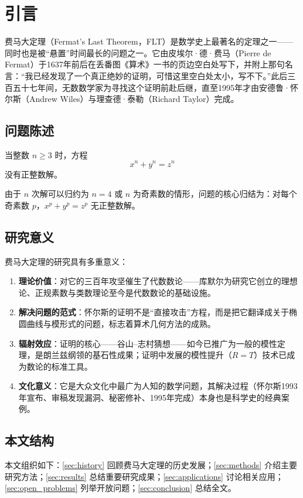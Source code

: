 \section{引言}\label{sec:introduction}

费马大定理（Fermat's Last Theorem，FLT）是数学史上最著名的定理之一——同时也是被“悬置”时间最长的问题之一。它由皮埃尔·德·费马（Pierre de Fermat）于1637年前后在丢番图《算术》一书的页边空白处写下，并附上那句名言：“我已经发现了一个真正绝妙的证明，可惜这里空白处太小，写不下。”此后三百五十七年间，无数数学家为寻找这个证明前赴后继，直至1995年才由安德鲁·怀尔斯（Andrew Wiles）与理查德·泰勒（Richard Taylor）完成\cite{wiles1995modular,taylor1995ring}。

\subsection{问题陈述}

\begin{theorem}[费马大定理]\label{thm:FLT}
    当整数 $n \ge 3$ 时，方程
    \begin{equation}
        x^n + y^n = z^n
    \end{equation}
    没有正整数解。
\end{theorem}

由于 $n$ 次解可以归约为 $n = 4$ 或 $n$ 为奇素数的情形，问题的核心归结为：对每个奇素数 $p$，$x^p + y^p = z^p$ 无正整数解。

\subsection{研究意义}

费马大定理的研究具有多重意义：

\begin{enumerate}[label=(\arabic*)]
    \item \textbf{理论价值}：对它的三百年攻坚催生了代数数论——库默尔为研究它创立的理想论、正规素数与类数理论至今是代数数论的基础设施。
    \item \textbf{解决问题的范式}：怀尔斯的证明不是“直接攻击”方程，而是把它翻译成关于椭圆曲线与模形式的问题，标志着算术几何方法的成熟。
    \item \textbf{辐射效应}：证明的核心——谷山--志村猜想——如今已推广为一般的模性定理，是朗兰兹纲领的基石性成果；证明中发展的模性提升（$R=T$）技术已成为数论的标准工具。
    \item \textbf{文化意义}：它是大众文化中最广为人知的数学问题，其解决过程（怀尔斯1993年宣布、审稿发现漏洞、秘密修补、1995年完成）本身也是科学史的经典案例。
\end{enumerate}

\subsection{本文结构}

本文组织如下：\cref{sec:history} 回顾费马大定理的历史发展；\cref{sec:methods} 介绍主要研究方法；\cref{sec:results} 总结重要研究成果；\cref{sec:applications} 讨论相关应用；\cref{sec:open_problems} 列举开放问题；\cref{sec:conclusion} 总结全文。
